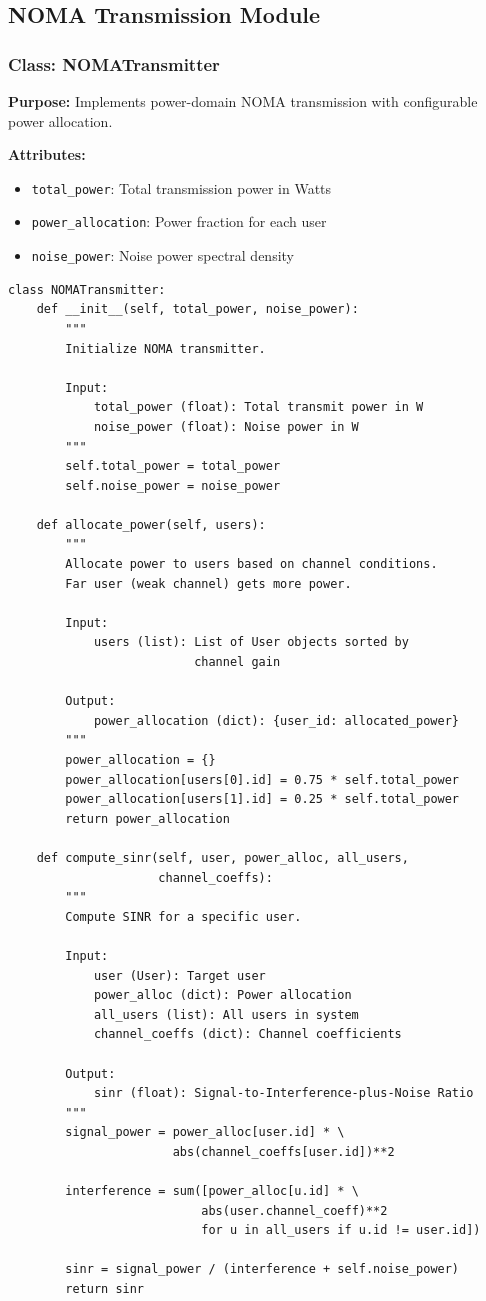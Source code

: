 \documentclass[12pt,a4paper]{article}
\begin{document}
\subsection{NOMA Transmission Module}

\subsubsection{Class: NOMATransmitter}

\textbf{Purpose:} Implements power-domain NOMA transmission with configurable power allocation.

\textbf{Attributes:}
\begin{itemize}
    \item \texttt{total\_power}: Total transmission power in Watts
    \item \texttt{power\_allocation}: Power fraction for each user
    \item \texttt{noise\_power}: Noise power spectral density
\end{itemize}

\begin{verbatim}
class NOMATransmitter:
    def __init__(self, total_power, noise_power):
        """
        Initialize NOMA transmitter.
        
        Input:
            total_power (float): Total transmit power in W
            noise_power (float): Noise power in W
        """
        self.total_power = total_power
        self.noise_power = noise_power
    
    def allocate_power(self, users):
        """
        Allocate power to users based on channel conditions.
        Far user (weak channel) gets more power.
        
        Input:
            users (list): List of User objects sorted by 
                          channel gain
        
        Output:
            power_allocation (dict): {user_id: allocated_power}
        """
        power_allocation = {}
        power_allocation[users[0].id] = 0.75 * self.total_power
        power_allocation[users[1].id] = 0.25 * self.total_power
        return power_allocation
    
    def compute_sinr(self, user, power_alloc, all_users, 
                     channel_coeffs):
        """
        Compute SINR for a specific user.
        
        Input:
            user (User): Target user
            power_alloc (dict): Power allocation
            all_users (list): All users in system
            channel_coeffs (dict): Channel coefficients
        
        Output:
            sinr (float): Signal-to-Interference-plus-Noise Ratio
        """
        signal_power = power_alloc[user.id] * \
                       abs(channel_coeffs[user.id])**2
        
        interference = sum([power_alloc[u.id] * \
                           abs(user.channel_coeff)**2 
                           for u in all_users if u.id != user.id])
        
        sinr = signal_power / (interference + self.noise_power)
        return sinr
\end{verbatim}
\end{document}
